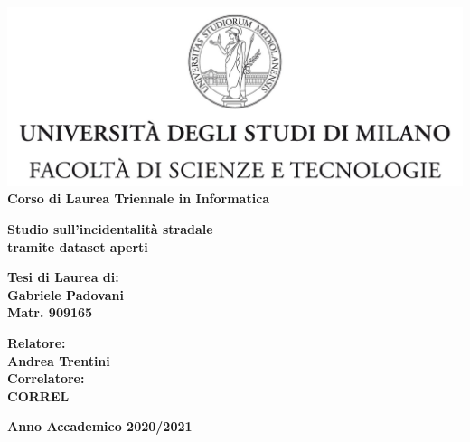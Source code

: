 \documentclass[a4paper]{report}
\begin{document}
\begin{titlepage}
\begin{center}
\includegraphics[width=\textwidth]{Logo.jpg}\\
{\large{\bf Corso di Laurea Triennale in Informatica}}
\end{center}
\vspace{12mm}
\begin{center}
{\huge{\bf Studio sull'incidentalità stradale}}\\
\vspace{4mm}
{\huge{\bf tramite dataset aperti}}\\
\end{center}
\vspace{12mm}
\begin{flushright}
{\large{\bf Tesi di Laurea di:}}\\
{\large{\bf Gabriele Padovani}}\\
{\large{\bf Matr. 909165}}\\
\end{flushright}
\vspace{4mm}
\begin{flushleft}
{\large{\bf Relatore:}}\\
{\large{\bf Andrea Trentini}}\\
\vspace{4mm}
{\large{\bf Correlatore:}}\\
{\large{\bf CORREL}}\\
\end{flushleft}
\vspace{12mm}
\begin{center}
{\large{\bf Anno Accademico 2020/2021}}
\end{center}
\end{titlepage}



\tableofcontents

\listoftodos
\end{document}
